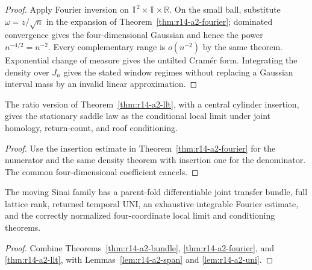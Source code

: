\begin{proof}
Apply Fourier inversion on
\(\mathbb T^2\times\mathbb T\times\mathbb R\).  On the small ball, substitute
\(\omega=z/\sqrt n\) in the expansion of
Theorem~\ref{thm:r14-a2-fourier}; dominated convergence gives the
four-dimensional Gaussian and hence the power \(n^{-4/2}=n^{-2}\).
Every complementary range is \(o(n^{-2})\) by the same theorem.  Exponential
change of measure gives the untilted Cramér form.  Integrating the density
over \(J_n\) gives the stated window regimes without replacing a Gaussian
interval mass by an invalid linear approximation.
\end{proof}

\begin{corollary}
\label{cor:r14-a2-condition}
The ratio version of
Theorem~\ref{thm:r14-a2-llt}, with a central cylinder insertion, gives the
stationary saddle law as the conditional local limit under joint homology,
return-count, and roof conditioning.
\end{corollary}

\begin{proof}
Use the insertion estimate in
Theorem~\ref{thm:r14-a2-fourier} for the numerator and the same density theorem
with insertion one for the denominator.  The common four-dimensional
coefficient cancels.
\end{proof}

\begin{theorem}
\label{thm:r14-a2-main}
The moving Sinai family has a parent-fold differentiable joint transfer
bundle, full lattice rank, returned temporal UNI, an exhaustive integrable
Fourier estimate, and the correctly normalized four-coordinate local limit
and conditioning theorems.
\end{theorem}

\begin{proof}
Combine Theorems~\ref{thm:r14-a2-bundle},
\ref{thm:r14-a2-fourier}, and \ref{thm:r14-a2-llt}, with
Lemmas~\ref{lem:r14-a2-span} and \ref{lem:r14-a2-uni}.
\end{proof}
